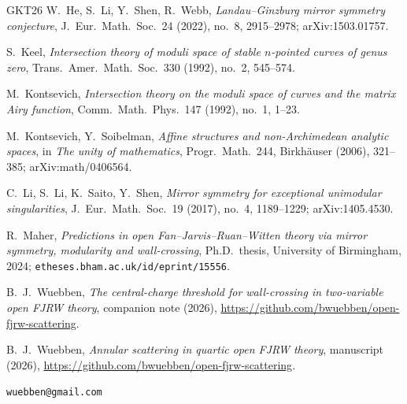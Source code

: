 \documentclass[11pt]{amsart}
\theoremstyle{definition}
\theoremstyle{remark}
\begin{document}
\begin{thebibliography}{GKT26}
 W.~He, S.~Li, Y.~Shen, R.~Webb,
\emph{Landau--Ginzburg mirror symmetry conjecture},
J.\ Eur.\ Math.\ Soc.\ 24 (2022), no.~8, 2915--2978; arXiv:1503.01757.

 S.~Keel,
\emph{Intersection theory of moduli space of stable $n$-pointed curves of
genus zero}, Trans.\ Amer.\ Math.\ Soc.\ 330 (1992), no.~2, 545--574.

 M.~Kontsevich,
\emph{Intersection theory on the moduli space of curves and the matrix Airy
function}, Comm.\ Math.\ Phys.\ 147 (1992), no.~1, 1--23.

 M.~Kontsevich, Y.~Soibelman,
\emph{Affine structures and non-Archimedean analytic spaces}, in
\emph{The unity of mathematics}, Progr.\ Math.\ 244, Birkh\"auser (2006), 321--385;
arXiv:math/0406564.

 C.~Li, S.~Li, K.~Saito, Y.~Shen,
\emph{Mirror symmetry for exceptional unimodular singularities},
J.\ Eur.\ Math.\ Soc.\ 19 (2017), no.~4, 1189--1229; arXiv:1405.4530.

 R.~Maher,
\emph{Predictions in open Fan--Jarvis--Ruan--Witten theory via mirror symmetry,
modularity and wall-crossing}, Ph.D.\ thesis, University of Birmingham, 2024;
\texttt{etheses.bham.ac.uk/id/eprint/15556}.

 B.~J.~Wuebben,
\emph{The central-charge threshold for wall-crossing in two-variable open FJRW
theory}, companion note (2026),
\url{https://github.com/bwuebben/open-fjrw-scattering}.

 B.~J.~Wuebben,
\emph{Annular scattering in quartic open FJRW theory}, manuscript (2026),
\url{https://github.com/bwuebben/open-fjrw-scattering}.

\end{thebibliography}

\bigskip
{} \texttt{wuebben@gmail.com}
\end{document}
